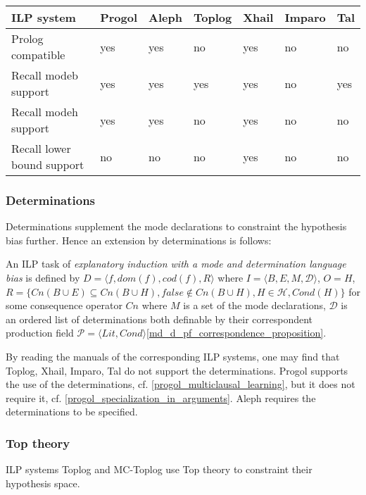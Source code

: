 \begin{minipage}{\linewidth}
 \label{tab:title} 
 \begin{tabular}{| l | l | l | l | l | l | l |}
    \hline
    ILP system & Progol & Aleph & Toplog & Xhail & Imparo & Tal \\ \hline
    Prolog compatible & yes & yes & no &  yes & no & no \\ \hline
    Recall modeb support & yes & yes & yes & yes & no & yes \\ \hline
    Recall modeh support & yes & yes & no & yes & no & no \\ \hline
    Recall lower bound support & no & no & no & yes & no & no \\ \hline
  \end{tabular}
\end{minipage}

\subsubsection{Determinations}
Determinations supplement the mode declarations to constraint the hypothesis bias further. Hence an extension by determinations is follows:

\begin{defn}
An ILP task of \emph{explanatory induction with a mode and determination language bias} is defined by $D=\langle f, dom(f), cod(f), R \rangle$ where
$I=\langle B, E, M, \mathcal{D}\rangle$, $O=H$,
$R=\{Cn(B \cup E) \subseteq Cn(B \cup H), false \not\in Cn(B \cup H), H \in \mathcal{H}, Cond(H)\}$ for some consequence operator $Cn$ where $M$ is a set of the mode declarations, $\mathcal{D}$ is an ordered list of determinations both definable by their correspondent production field $\mathcal{P}=\langle Lit, Cond \rangle$\ref{md_d_pf_correspondence_proposition}.
\end{defn}

By reading the manuals of the corresponding ILP systems, one may find that
Toplog, Xhail, Imparo, Tal do not support the determinations.
Progol supports the use of the determinations, cf. \ref{progol_multiclausal_learning}, but it does not require it, cf. \ref{progol_specialization_in_arguments}.
Aleph requires the determinations to be specified.

\subsubsection{Top theory}
ILP systems Toplog and MC-Toplog use Top theory to constraint their hypothesis space.

